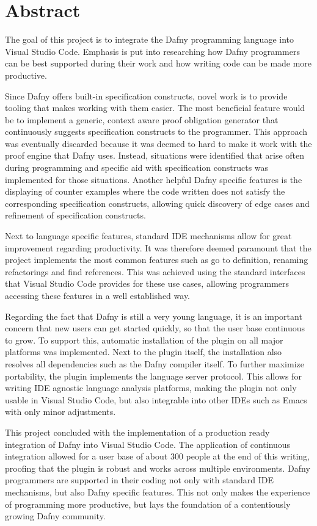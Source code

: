 \section{Abstract}
The goal of this project is to integrate the Dafny programming language into Visual Studio Code. Emphasis is put into researching how Dafny programmers can be best supported during their work and how writing code can be made more productive. \newline

Since Dafny offers built-in specification constructs, novel work is to provide tooling that makes working with them easier. The most beneficial feature would be to implement a generic, context aware proof obligation generator that continuously suggests specification constructs to the programmer. This approach was eventually discarded because it was deemed to hard to make it work with the proof engine that Dafny uses. Instead, situations were identified that arise often during programming and specific aid with specification constructs was implemented for those situations. Another helpful Dafny specific features is the displaying of counter examples where the code written does not satisfy the corresponding specification constructs, allowing quick discovery of edge cases and refinement of specification constructs. \newline

Next to language specific features, standard IDE mechanisms allow for great improvement regarding productivity. It was therefore deemed paramount that the project implements the most common features such as go to definition, renaming refactorings and find references. This was achieved using the standard interfaces that Visual Studio Code provides for these use cases, allowing programmers accessing these features in a well established way. \newline

Regarding the fact that Dafny is still a very young language, it is an important concern that new users can get started quickly, so that the user base continuous to grow. To support this, automatic installation of the plugin on all major platforms was implemented. Next to the plugin itself, the installation also resolves all dependencies such as the Dafny compiler itself. To further maximize portability, the plugin implements the language server protocol. This allows for writing IDE agnostic language analysis platforms, making the plugin not only usable in Visual Studio Code, but also integrable into other IDEs such as Emacs with only minor adjustments. \newline

This project concluded with the implementation of a production ready integration of Dafny into Visual Studio Code. The application of continuous integration allowed for a user base of about 300 people at the end of this writing, proofing that the plugin is robust and works across multiple environments. Dafny programmers are supported in their coding not only with standard IDE mechanisms, but also Dafny specific features. This not only makes the experience of programming more productive, but lays the foundation of a contentiously growing Dafny community. \newline

